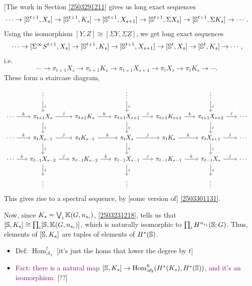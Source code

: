 \documentclass{MetricNotes2023}
\def\bb{\ensuremath\mathbb}
\def\A{\ensuremath{\mathscr{A}_2}}
\DeclareMathOperator{\Hom}{Hom}
\def\textcolour{\textcolor}
\begin{document}
[The work in Section \ref{2503291211} gives us long exact sequences
\[\cdots \to [\bb{S}^{t+1}, X_s] \to [\bb{S}^{t+1}, K_s] \to [\bb{S}^{t+1}, X_{s+1}]\to [\bb{S}^{t+1}, \Sigma X_s]\to [\bb{S}^{t+1}, \Sigma K_s] \to \cdots.\]
Using the isomorphism \([Y,Z]\cong [\Sigma Y, \Sigma Z]\), we get long exact sequences
\[\cdots \to [\Sigma^\infty S^{t+1}, X_s] \to [\bb{S}^{t+1}, K_s] \to [\bb{S}^{t+1}, X_{s+1}]\to [\bb{S}^{t}, X_s]\to [\bb{S}^{t}, K_s] \to \cdots,\]
i.e.
\[\cdots \to \pi_{t+1}X_s \to \pi_{t+1}K_s \to \pi_{t+1}X_{s+1}\to \pi_t X_s\to \pi_t K_s \to \cdots.\]
These form a staircase diagram,
\[\begin{tikzcd}[column sep=4ex]
   &  \vdots \arrow[d, "i"] &  & \vdots \arrow[d, "i"] &  & \vdots \arrow[d, "i"] & \\
 \cdots \arrow[r, "k"] & \pi_{t+1}X_s \arrow[d, "i"] \arrow[r, "j"] & \pi_{t+1}K_s  \arrow[r, "k"] & \pi_{t+1}X_{s+1} \arrow[d, "i"] \arrow[r, "j"] & \pi_{t+1}K_{s+1} \arrow[r, "k"] & \pi_{t+1}X_{s+2} \arrow[d, "i"] \arrow[r, "j"] & \cdots \\
 \cdots \arrow[r, "k"] & \pi_t X_{s-1} \arrow[d, "i"] \arrow[r, "j"] & \pi_t K_{s-1}  \arrow[r, "k"] & \pi_t X_s \arrow[d, "i"] \arrow[r, "j"] & \pi_t K_s \arrow[r, "k"] & \pi_t X_{s+1} \arrow[d, "i"] \arrow[r, "j"] & \cdots \\
 \cdots \arrow[r, "k"] & \pi_{t-1}X_{s-2}  \arrow[d, "i"] \arrow[r, "j"] & \pi_{t-1}K_{s-2}  \arrow[r, "k"] & \pi_{t-1}X_{s-1} \arrow[d, "i"] \arrow[r, "j"] & \pi_{t-1}K_{s-1} \arrow[r, "k"] & \pi_{t-1}X_s \arrow[d, "i"] \arrow[r, "j"] & \cdots \\
 & \vdots &  & \vdots & & \vdots &
\end{tikzcd}\]
This gives rise to a spectral sequence, by [some version of] \ref{2503301131}.

Now, since \(K_s = \bigvee_i \bb{K}(G, n_{s_i})\),  \ref{2503231218}, tells us that \([\bb{S}, K_s]\cong \prod_i[\bb{S}, \bb{K}(G, n_{s_i})]\), which is naturally isomorphic to \(\prod_i H^{n_{s_i}}(\bb{S}; G)\). Thus, elements of \([\bb{S}, K_s]\) are tuples of elements of \(H^*(\bb{S})\).

\begin{itemize}
\item Def: \(\Hom^t_{\A}\) [it's just the homs that lower the degree by \(t\)]

\item \textcolour{purple}{Fact: there is a natural map \([\bb{S}, K_s]\to \Hom^0_{\A}(H^*(K_s), H^*(\bb{S}))\), and it's an isomorphism.} [??]
\end{itemize}
\end{document}
